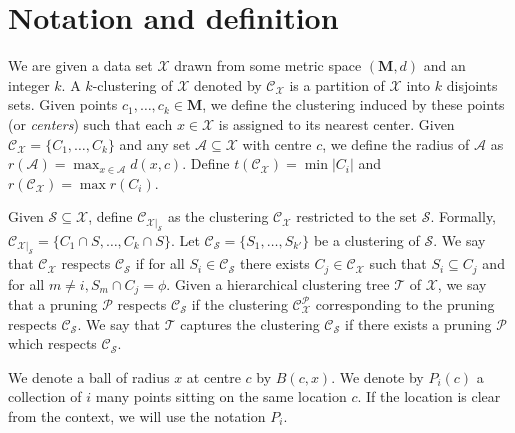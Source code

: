 \documentclass[anon,12pt]{colt2016} %
\newcommand{\mc}{\mathcal}
\newcommand{\mb}{\mathbf}
\begin{document}
\section{Notation and definition}
We are given a data set $\mc X$ drawn from some metric space $(\mb M, d)$ and an integer $k$. A $k$-clustering of $\mc X$ denoted by $\mc C_{\mc X}$ is a partition of $\mc X$ into $k$ disjoints sets. Given points $c_1, \ldots, c_k \in \mb M$, we define the clustering induced by these points (or {\it centers}) such that each $x \in \mc X$ is assigned to its nearest center.
Given $\mc C_{\mc X} = \{C_1, \ldots, C_k\}$ and any set $\mc A\subseteq \mc X$ with centre $c$, we define the radius of $\mc A$ as $r(\mc A) = \max_{x \in \mc A} d(x, c)$. Define $t(\mc{C}_{\mc{X}}) = \min |C_i|$ and $r(\mc{C}_{\mc{X}}) = \max r(C_i)$. 


Given $\mc S \subseteq \mc X$, define $\mc C_{{\mc X}|_{\mc S}}$ as the clustering $\mc C_{\mc X}$ restricted to the set $\mc S$. Formally, $\mc C_{{\mc X}|_{\mc S}} = \{C_1 \cap S, \ldots, C_k \cap S\}$. Let $\mc C_{\mc S} = \{S_1, \ldots, S_{k'}\}$ be a clustering of $\mc S$. We say that $\mc C_{\mc X}$ respects $\mc C_{\mc S}$ if for all $S_i \in \mc C_{\mc S}$ there exists $C_j \in \mc C_{\mc X}$ such that $S_i \subseteq C_j$ and for all $m \neq i, S_m \cap C_j = \phi$. Given a hierarchical clustering tree $\mc T$ of $\mc X$, we say that a pruning $\mc P$ respects $\mc C_{\mc S}$ if the clustering $\mc C_{\mc X}^{\mc P}$ corresponding to the pruning respects $\mc C_{\mc S}$. We say that $\mc T$ captures the clustering $\mc C_{\mc S}$ if there exists a pruning $\mc P$ which respects $\mc C_{\mc S}$.

We denote a ball of radius $x$ at centre $c$ by $B(c, x)$. We denote by $P_{i}(c)$ a collection of $i$ many points sitting on the same location $c$. If the location is clear from the context, we will use the notation $P_i$.

\end{document}
